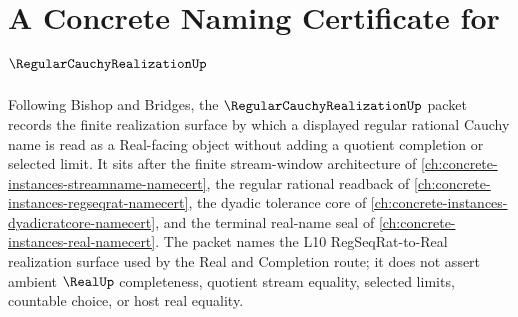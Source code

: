 \chapter{A Concrete Naming Certificate for $\RegularCauchyRealizationUp$}
\label{ch:concrete-instances-regular-cauchy-realization-namecert}

Following Bishop and Bridges, the $\RegularCauchyRealizationUp$ packet records the finite realization surface by which a displayed regular rational Cauchy name is read as a Real-facing object without adding a quotient completion or selected limit. It sits after the finite stream-window architecture of \autoref{ch:concrete-instances-streamname-namecert}, the regular rational readback of \autoref{ch:concrete-instances-regseqrat-namecert}, the dyadic tolerance core of \autoref{ch:concrete-instances-dyadicratcore-namecert}, and the terminal real-name seal of \autoref{ch:concrete-instances-real-namecert}. The packet names the L10 RegSeqRat-to-Real realization surface used by the Real and Completion route; it does not assert ambient $\RealUp$ completeness, quotient stream equality, selected limits, countable choice, or host real equality.

